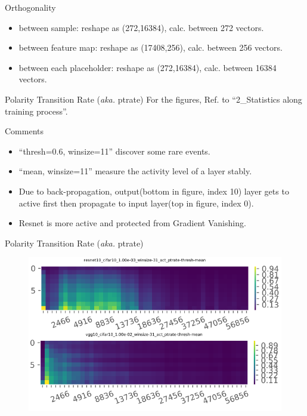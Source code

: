\documentclass[notes]{beamer}
\newcommand{\wuhao}{\fontsize{10.5pt}{\baselineskip}\selectfont}    %
\newcommand{\liuhao}{\fontsize{7.875pt}{\baselineskip}\selectfont}  %
\begin{document}
\begin{frame}{Orthogonality}
		
		
		
	\begin{example}
    \wuhao 
    \begin{itemize}
    \item between sample: reshape as (272,16384),   calc. between 272 vectors.
    \item between feature map: reshape as (17408,256), calc. between 256 vectors.  
    \item between each placeholder: reshape as (272,16384), calc. between 16384 vectors.
    \end{itemize}
	\end{example}
\end{frame}

\begin{frame}{Polarity Transition Rate (\textit{aka.} ptrate)}
For the figures, Ref. to ``2\_Statistics along training process''.
	\begin{block}{Comments} 
		\begin{itemize}
		\item   ``thresh=0.6, winsize=11'' discover some rare events. 
		\item  ``mean,  winsize=11'' measure the activity level of a layer stably. 
		\item Due to back-propagation, output(bottom in figure, index 10) layer gets to active first then propagate to input layer(top in figure, index 0). 
        \item Resnet is more active and protected from Gradient Vanishing.
		\end{itemize} 
	\end{block} 
\end{frame}

\begin{frame}{Polarity Transition Rate (\textit{aka.} ptrate)}
\begin{figure} 
		\includegraphics[width=.75\textwidth]{heatmap.png}
	\end{figure}
\end{frame}
\end{document}
